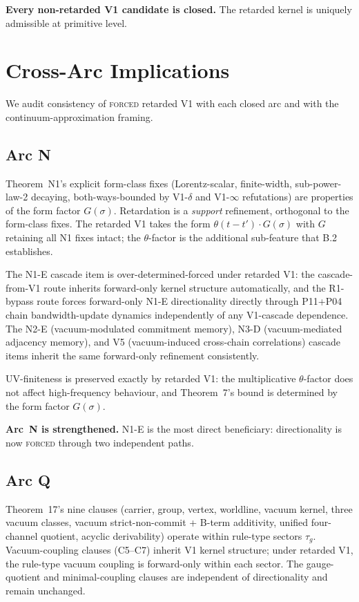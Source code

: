 \documentclass[11pt,a4paper]{article}
\begin{document}
\textbf{Every non-retarded V1 candidate is closed.} The retarded kernel is uniquely admissible at primitive level.

\section{Cross-Arc Implications}

We audit consistency of \textsc{forced} retarded V1 with each closed arc and with the continuum-approximation framing.

\subsection{Arc N}

Theorem~N1's explicit form-class fixes (Lorentz-scalar, finite-width, sub-power-law-2 decaying, both-ways-bounded by V1-$\delta$ and V1-$\infty$ refutations) are properties of the form factor $G(\sigma)$. Retardation is a \emph{support} refinement, orthogonal to the form-class fixes. The retarded V1 takes the form $\theta(t-t') \cdot G(\sigma)$ with $G$ retaining all N1 fixes intact; the $\theta$-factor is the additional sub-feature that B.2 establishes.

The N1-E cascade item is over-determined-forced under retarded V1: the cascade-from-V1 route inherits forward-only kernel structure automatically, and the R1-bypass route forces forward-only N1-E directionality directly through P11+P04 chain bandwidth-update dynamics independently of any V1-cascade dependence. The N2-E (vacuum-modulated commitment memory), N3-D (vacuum-mediated adjacency memory), and V5 (vacuum-induced cross-chain correlations) cascade items inherit the same forward-only refinement consistently.

UV-finiteness is preserved exactly by retarded V1: the multiplicative $\theta$-factor does not affect high-frequency behaviour, and Theorem~7's bound is determined by the form factor $G(\sigma)$.

\textbf{Arc~N is strengthened.} N1-E is the most direct beneficiary: directionality is now \textsc{forced} through two independent paths.

\subsection{Arc Q}

Theorem~17's nine clauses (carrier, group, vertex, worldline, vacuum kernel, three vacuum classes, vacuum strict-non-commit + B-term additivity, unified four-channel quotient, acyclic derivability) operate within rule-type sectors $\tau_g$. Vacuum-coupling clauses (C5--C7) inherit V1 kernel structure; under retarded V1, the rule-type vacuum coupling is forward-only within each sector. The gauge-quotient and minimal-coupling clauses are independent of directionality and remain unchanged.
\end{document}
